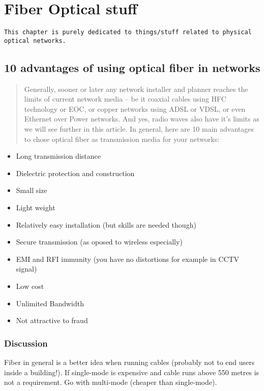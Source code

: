 \chapter{Fiber Optical stuff}

\texttt{This chapter is purely dedicated to things/stuff related to physical optical networks.}

\section{10 advantages of using optical fiber in networks}

\begin{quotation}
    Generally, sooner or later any network installer and planner reaches the limits of current network media – be it coaxial cables using HFC technology or EOC, or copper networks using ADSL or VDSL, or even Ethernet over Power networks. And yes, radio waves also have it’s limits as we will see further in this article. In general, here are 10 main advantages to chose optical fiber as transmission media for your networks:\cite{10advant21:online}
\end{quotation}


\begin{itemize}
    \item Long transmission distance
    \item Dielectric protection and construction
    \item Small size
    \item Light weight
    \item Relatively easy installation (but skills are needed though)
    \item Secure transmission (as oposed to wireless especially)
    \item EMI and RFI immunity (you have no distortions for example in CCTV signal)
    \item Low cost
    \item Unlimited Bandwidth
    \item Not attractive to fraud
\end{itemize}

\subsection{Discussion}

Fiber in general is a better idea when running cables (probably not to end users inside a building!). If single-mode is expensive and cable runs above 550 metres is not a requirement. Go with multi-mode (cheaper than single-mode).

